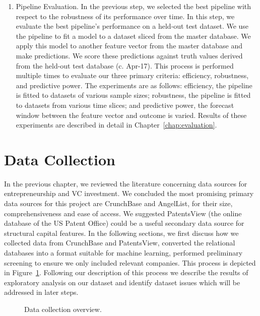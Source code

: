 \documentclass[../thesis/thesis.tex]{subfiles}
\begin{document}
\begin{enumerate}
\item Pipeline Evaluation. In the previous step, we selected the best pipeline with respect to the robustness of its performance over time. In this step, we evaluate the best pipeline’s performance on a held-out test dataset. We use the pipeline to fit a model to a dataset sliced from the master database. We apply this model to another feature vector from the master database and make predictions. We score these predictions against truth values derived from the held-out test database (c. Apr-17). This process is performed multiple times to evaluate our three primary criteria: efficiency, robustness, and predictive power. The experiments are as follows: efficiency, the pipeline is fitted to datasets of various sample sizes; robustness, the pipeline is fitted to datasets from various time slices; and predictive power, the forecast window between the feature vector and outcome is varied. Results of these experiments are described in detail in Chapter~\ref{chap:evaluation}.

\end{enumerate}

\section{Data Collection}

In the previous chapter, we reviewed the literature concerning data sources for entrepreneurship and VC investment. We concluded the most promising primary data sources for this project are CrunchBase and AngelList, for their size, comprehensiveness and ease of access. We suggested PatentsView (the online database of the US Patent Office) could be a useful secondary data source for structural capital features. In the following sections, we first discuss how we collected data from CrunchBase and PatentsView, converted the relational databases into a format suitable for machine learning, performed preliminary screening to ensure we only included relevant companies. This process is depicted in Figure~\ref{fig:design:data_collection}. Following our description of this process we describe the results of exploratory analysis on our dataset and identify dataset issues which will be addressed in later steps.

\begin{figure}[!htb]
    \centering
    \caption{Data collection overview.}
    \label{fig:design:data_collection}
\end{figure}
\end{document}
